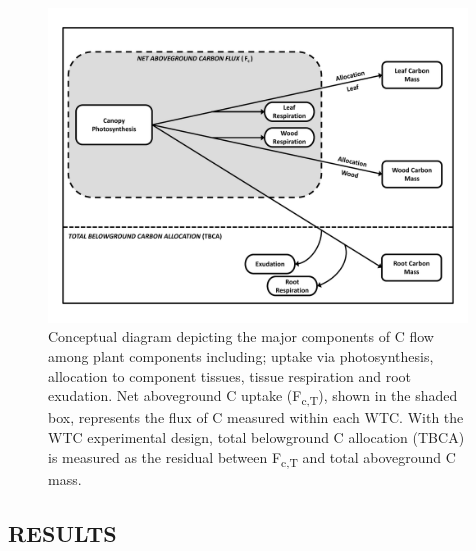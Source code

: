 \documentclass[a4paper]{article}\usepackage[]{graphicx}\usepackage[]{color}
\begin{document}
\begin{figure}[p!]
    \centering
    \includegraphics[width=0.99\textwidth]{conceptfig_wtc1.pdf}
    \caption{Conceptual diagram depicting the major components of C flow among plant components including; uptake via photosynthesis, allocation to component tissues, tissue respiration and root exudation. Net aboveground C uptake (F\textsubscript{c,T}), shown in the shaded box, represents the flux of C measured within each WTC. With the WTC experimental design, total belowground C allocation (TBCA) is measured as the residual between F\textsubscript{c,T} and total aboveground C mass. }
    \label{fig:figure 4.1}
\end{figure}

\subsection*{RESULTS}
\end{document}
